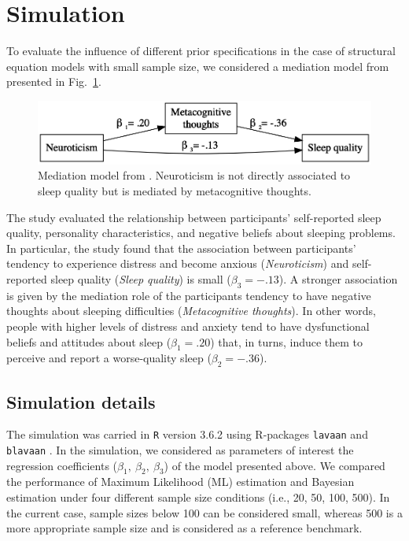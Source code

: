 \documentclass[graybox]{svmult}
\begin{document}
\section{Simulation}
\label{sec:simulation}

To evaluate the influence of different prior specifications in the case of structural equation models with small sample size, we considered a mediation model from \cite{sellaPersonalityTraitsSleep2020}  presented in Fig.~\ref{fig:example_model}.
\begin{figure}[t]
	\sidecaption
	\includegraphics[width = .64\textwidth]{figure/Plot_example_model}
	\caption{Mediation model from \cite{sellaPersonalityTraitsSleep2020}. Neuroticism is not directly associated to sleep quality but is mediated by metacognitive thoughts.}
	\label{fig:example_model}
\end{figure}
The study evaluated the relationship between participants' self-reported sleep quality, personality characteristics, and negative beliefs about sleeping problems. In particular, the study found that the association between participants' tendency to experience distress and become anxious (\emph{Neuroticism}) and self-reported sleep quality (\emph{Sleep quality}) is small ($\beta_3=-.13$).  A stronger association is given  by the mediation role of the participants tendency to have negative thoughts about sleeping difficulties (\emph{Metacognitive thoughts}). In other words, people with higher levels of distress and anxiety tend to have dysfunctional beliefs and attitudes about sleep ($\beta_1=.20$) that, in turns, induce them to perceive and report a worse-quality sleep ($\beta_2=-.36$).

\subsection{Simulation details}

The simulation was carried in \texttt{R} version 3.6.2 \cite{rcoreteamLanguageEnvironmentStatistical2018} using R-packages \texttt{lavaan} \cite{rosseelLavaanPackageStructural2012} and \texttt{blavaan} \cite{merkleBlavaanBayesianStructural2018}. In the simulation, we  considered as parameters of interest the regression coefficients ($\beta_1,\ \beta_2,\ \beta_3$) of the model presented above. We compared the performance of Maximum Likelihood (ML) estimation and Bayesian estimation under four different sample size conditions (i.e., 20, 50, 100, 500). In the current case, sample sizes below 100 can be considered small, whereas 500 is a more appropriate sample size and is considered as a reference benchmark.
\end{document}

